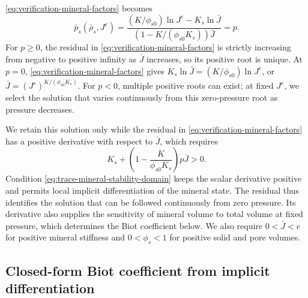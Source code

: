 \eqref{eq:verification-mineral-factors} becomes
\begin{equation*}
 \bar p_s(\bar\rho_s,J^e)
 =\frac{(K/\phi_{s0})\ln J^e-K_s\ln\bar J}
 {\left(1-K/(\phi_{s0}K_s)\right)\bar J}=p.
\end{equation*}
For \(p\geq0\), the residual in
\eqref{eq:verification-mineral-factors} is strictly increasing from
negative to positive infinity as \(\bar J\) increases, so its positive
root is unique.  At \(p=0\), \eqref{eq:verification-mineral-factors} gives
\(K_s\ln\bar J=(K/\phi_{s0})\ln J^e\), or
\(\bar J=(J^e)^{K/(\phi_{s0}K_s)}\).  For \(p<0\), multiple positive roots
can exist; at fixed \(J^e\), we select the solution that varies continuously
from this zero-pressure root as pressure decreases.

We retain this solution only while the residual in
\eqref{eq:verification-mineral-factors} has a
positive derivative with respect to \(\bar J\), which requires
\begin{equation}
 K_s+\left(1-\frac{K}{\phi_{s0}K_s}\right)p\bar J>0.
 \label{eq:trace-mineral-stability-domain}
\end{equation}
Condition \eqref{eq:trace-mineral-stability-domain} keeps the scalar
derivative positive and permits local implicit differentiation of the
mineral state.  The residual thus identifies the solution that can be
followed continuously
from zero pressure.  Its derivative also supplies the sensitivity of mineral
volume to total volume at fixed pressure, which determines the Biot
coefficient below.
We also require \(0<\bar J<e\) for positive mineral
stiffness and \(0<\phi_s<1\) for positive solid and pore volumes.


\subsection{Closed-form Biot coefficient from implicit differentiation}

